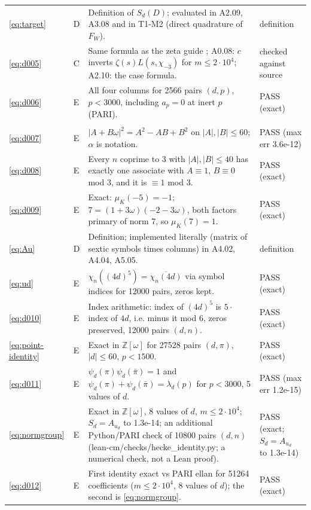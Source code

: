 \documentclass[11pt]{article}
\numberwithin{equation}{section}
\begin{document}
\begin{longtable}{@{}>{\raggedright\arraybackslash}p{1.2cm}>{\centering\arraybackslash}p{0.7cm}>{\raggedright\arraybackslash}p{9.05cm}>{\raggedright\arraybackslash}p{4.3cm}@{}}
\eqref{eq:target} & D & Definition of $S_d(D)$; evaluated in A2.09, A3.08 and in T1-M2 (direct quadrature of $F_W$). & definition\\
\eqref{eq:d005} & C & Same formula as the zeta guide \cite[(1.2)]{ZG}; A0.08: $c$ inverts $\zeta(s)L(s,\chi_{-3})$ for $m\le2\cdot10^4$; A2.10: the case formula. & checked against source\\
\eqref{eq:d006} & E & All four columns for 2566 pairs $(d,p)$, $p<3000$, including $a_p=0$ at inert $p$ (PARI). & PASS (exact)\\
\multicolumn{4}{@{}l}{\emph{Section~3}}\\
\eqref{eq:d007} & E & $|A+B\omega|^2=A^2-AB+B^2$ on $|A|,|B|\le60$; $\alpha$ is notation. & PASS (max err 3.6e-12)\\
\eqref{eq:d008} & E & Every $n$ coprime to 3 with $|A|,|B|\le40$ has exactly one associate with $A\equiv1$, $B\equiv0$ mod 3, and it is $\equiv1$ mod 3. & PASS (exact)\\
\eqref{eq:d009} & E & Exact: $\mu_K(-5)=-1$; $7=(1+3\omega)(-2-3\omega)$, both factors primary of norm 7, so $\mu_K(7)=1$. & PASS (exact)\\
\eqref{eq:Au} & D & Definition; implemented literally (matrix of sextic symbols times columns) in A4.02, A4.04, A5.05. & definition\\
\eqref{eq:ud} & E & $\chi_n((4d)^5)=\overline{\chi_n(4d)}$ via symbol indices for 12000 pairs, zeros kept. & PASS (exact)\\
\eqref{eq:d010} & E & Index arithmetic: index of $(4d)^5$ is $5\cdot$index of $4d$, i.e. minus it mod 6, zeros preserved, 12000 pairs $(d,n)$. & PASS (exact)\\
\eqref{eq:point-identity} & E & Exact in $\mathbb Z[\omega]$ for 27528 pairs $(d,\pi)$, $|d|\le60$, $p<1500$. & PASS (exact)\\
\eqref{eq:d011} & E & $\psi_d(\pi)\psi_d(\bar\pi)=1$ and $\psi_d(\pi)+\psi_d(\bar\pi)=\lambda_d(p)$ for $p<3000$, 5 values of $d$. & PASS (max err 1.2e-15)\\
\eqref{eq:normgroup} & E & Exact in $\mathbb Z[\omega]$, 8 values of $d$, $m\le2\cdot10^4$; $S_d=A_{u_d}$ to 1.3e-14; an additional Python/PARI check of 10800 pairs $(d,n)$ (lean-cm/checks/hecke\_identity.py; a numerical check, not a Lean proof). & PASS (exact; $S_d=A_{u_d}$ to 1.3e-14)\\
\eqref{eq:d012} & E & First identity exact vs PARI ellan for 51264 coefficients ($m\le2\cdot10^4$, 8 values of $d$); the second is \eqref{eq:normgroup}. & PASS (exact)\\

\end{longtable}
\end{document}

